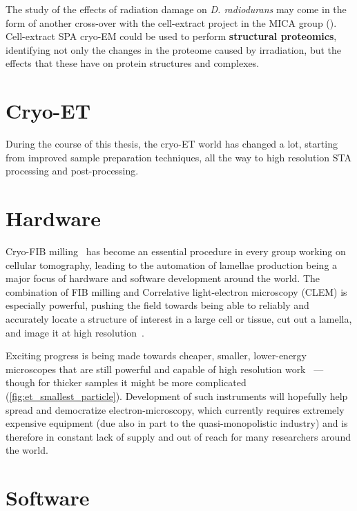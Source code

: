 The study of the effects of radiation damage on \textit{D. radiodurans} may come in the form of another cross-over with the cell-extract project in the MICA group ().
Cell-extract SPA cryo-EM could be used to perform \textbf{structural proteomics}, identifying not only the changes in the proteome caused by irradiation, but the effects that these have on protein structures and complexes.


\section{Cryo-ET}

During the course of this thesis, the cryo-ET world has changed a lot, starting from improved sample preparation techniques, all the way to high resolution STA processing and post-processing.

\section{Hardware}

Cryo-FIB milling~\cite{markoFocusedionbeamThinningFrozenhydrated2007} has become an essential procedure in every group working on cellular tomography, leading to the automation of lamellae production being a major focus of hardware and software development around the world.
The combination of FIB milling and Correlative light-electron microscopy (CLEM) is especially powerful, pushing the field towards being able to reliably and accurately locate a structure of interest in a large cell or tissue, cut out a lamella, and image it at high resolution~\cite{bergerCryoelectronTomographyFocused2023,debeerPreciseTargeting3D2023,klumpeModularPlatformAutomated2021}.

Exciting progress is being made towards cheaper, smaller, lower-energy microscopes that are still powerful and capable of high resolution work~\cite{naydenovaCryoEM100KeV2019,russoElectronCryomicroscopeHardware2023} --- though for thicker samples it might be more complicated (\autoref{fig:et_smallest_particle}).
Development of such instruments will hopefully help spread and democratize electron-microscopy, which currently requires extremely expensive equipment (due also in part to the quasi-monopolistic industry) and is therefore in constant lack of supply and out of reach for many researchers around the world.


\section{Software}

